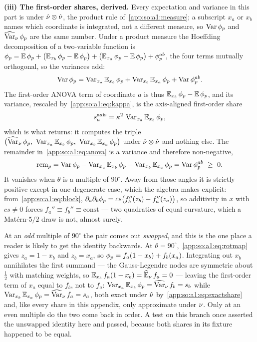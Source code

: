 \textbf{(iii) The first-order shares, derived.} Every expectation and variance
in this part is under $\hat\nu\otimes\hat\nu$, the product rule
of~\ref{app:so:a1:measure}; a subscript $x_a$ or $x_b$ names which coordinate
is integrated, not a different measure, so $\Varx{}\phip$ and $\operatorname{\widehat{\mathrm{Var}}}_\nu\phi_p$
are the same number. Under a product measure the Hoeffding decomposition of a
two-variable function is
$\phip=\Ex{}\phip+\bigl(\Ex{x_b}\phip-\Ex{}\phip\bigr)
+\bigl(\Ex{x_a}\phip-\Ex{}\phip\bigr)+\phip^{ab}$, the four terms mutually
orthogonal, so the variances add:
\begin{equation}\label{app:so:a1:eq:anova}
  \Varx{}\phip
  =\Varx{x_a}\Ex{x_b}\phip
  +\Varx{x_b}\Ex{x_a}\phip
  +\Varx{}\phip^{ab}.
\end{equation}
The first-order ANOVA term of coordinate $a$ is thus
$\Ex{x_b}\phip-\Ex{}\phip$, and its variance, rescaled
by~\eqref{app:so:a1:eq:kappa}, is the axis-aligned first-order share
\begin{equation}\label{app:so:a1:eq:saxis}
  \saxis{a}=\kappa^2\,\Varx{x_a}\Ex{x_b}\phip,
\end{equation}
which is what  returns: it computes the
triple $\bigl(\Varhat\phip,\ \Varx{x_a}\Ex{x_b}\phip,\
\Varx{x_b}\Ex{x_a}\phip\bigr)$ under $\hat\nu\otimes\hat\nu$ and nothing else.
The remainder in~\eqref{app:so:a1:eq:anova} is a variance and therefore
non-negative,
\begin{equation}\label{app:so:a1:eq:remainder}
  \mathrm{rem}_p
  =\Varx{}\phip-\Varx{x_a}\Ex{x_b}\phip-\Varx{x_b}\Ex{x_a}\phip
  =\Varx{}\phip^{ab}\ \ge\ 0 .
\end{equation}
It vanishes when $\theta$ is a multiple of $90^\circ$. Away from those angles
it is strictly positive except in one degenerate case, which the algebra makes
explicit: from~\eqref{app:so:a1:eq:block},
$\partial_a\partial_b\phi_p=cs\bigl(f_b''(z_b)-f_a''(z_a)\bigr)$, so additivity
in $x$ with $cs\neq0$ forces $f_a''\equiv f_b''\equiv\text{const}$ --- two
quadratics of equal curvature, which a Mat\'ern-$5/2$ draw is not, almost
surely.

At an \emph{odd} multiple of $90^\circ$ the pair comes out \emph{swapped}, and
this is the one place a reader is likely to get the identity backwards. At
$\theta=90^\circ$,~\eqref{app:so:a1:eq:rotmap} gives $z_a=1-x_b$ and
$z_b=x_a$, so $\phi_p=f_a(1-x_b)+f_b(x_a)$. Integrating out $x_b$ annihilates
the first summand --- the Gauss-Legendre nodes are symmetric about $\tfrac12$
with matching weights, so $\Ex{x_b}f_a(1-x_b)=\Ehat f_a=0$ --- leaving the
first-order term of $x_a$ equal to $f_b$, not to $f_a$:
$\Varx{x_a}\Ex{x_b}\phip=\Varhat f_b=s_b$ while
$\Varx{x_b}\Ex{x_a}\phip=\Varhat f_a=s_a$, both exact under $\hat\nu$
by~\eqref{app:so:a1:eq:exactshare} and, like every share in this appendix,
only approximate under $\nu$. Only at an even multiple do the two come back
in order. A test on this branch once asserted the unswapped identity here and
passed, because both shares in its fixture happened to be equal.

